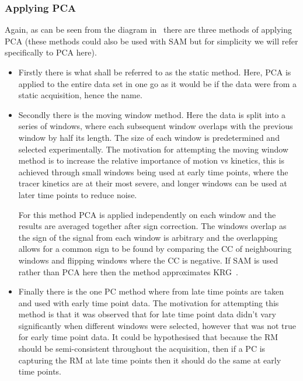                 \subsubsection{Applying PCA} \label{sec:pca_data_driven_surrogate_signal_extraction_methods_for_dynamic_pet_methods_applying_pca}
                    Again, as can be seen from the diagram in~ there are three methods of applying \gls{PCA} (these methods could also be used with \gls{SAM} but for simplicity we will refer specifically to \gls{PCA} here).
                    
                    \begin{itemize}
                        \item Firstly there is what shall be referred to as the static method. Here, \gls{PCA} is applied to the entire data set in one go as it would be if the data were from a static acquisition, hence the name.
                        
                        \item Secondly there is the moving window method. Here the data is split into a series of windows, where each subsequent window overlaps with the previous window by half its length. The size of each window is predetermined and selected experimentally. The motivation for attempting the moving window method is to increase the relative importance of motion vs kinetics, this is achieved through small windows being used at early time points, where the tracer kinetics are at their most severe, and longer windows can be used at later time points to reduce noise.
                        
                        For this method \gls{PCA} is applied independently on each window and the results are averaged together after sign correction. The windows overlap as the sign of the signal from each window is arbitrary and the overlapping allows for a common sign to be found by comparing the \gls{CC} of neighbouring windows and flipping windows where the \gls{CC} is negative. If \gls{SAM} is used rather than \gls{PCA} here then the method approximates \gls{KRG}~.

                        \item Finally there is the one \gls{PC} method where  from late time points are taken and used with early time point data. The motivation for attempting this method is that it was observed that  for late time point data didn't vary significantly when different windows were selected, however that was not true for early time point data. It could be hypothesised that because the \gls{RM} should be semi-consistent throughout the acquisition, then if a \gls{PC} is capturing the \gls{RM} at late time points then it should do the same at early time points.
                        

\end{itemize}

